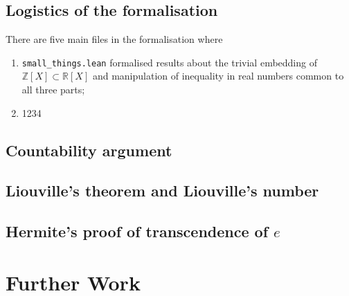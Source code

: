\documentclass{report}
\theoremstyle{definition}
\theoremstyle{plain}
\begin{document}
\section*{Logistics of the formalisation}
There are five main files in the formalisation where 
\begin{enumerate}
\item {\tt small\_things.lean} formalised results about the trivial embedding of $\mathbb Z[X]\subset \mathbb R[X]$ and manipulation of inequality in real numbers common to all three parts;
\item 1234
\end{enumerate}

\section{Countability argument}\label{fmlsn:count}
\section{Liouville's theorem and Liouville's number}\label{fmlsn:li}
\section{Hermite's proof of transcendence of $e$}\label{fmlsn:e}

\chapter{Further Work}


%
\nocite{*}
\printbibliography
\end{document}
